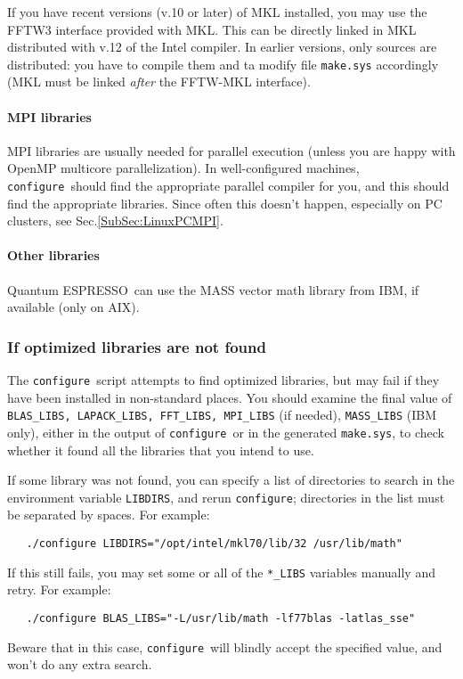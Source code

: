 \documentclass[12pt,a4paper]{article}
\def\qe{{\sc Quantum ESPRESSO}}
\def\configure{\texttt{configure}}
\begin{document}
If you have recent versions (v.10 or later) of MKL installed, you 
may use the FFTW3 interface provided with MKL. This can be directly
linked in MKL distributed with v.12 of the Intel compiler. In earlier 
versions, only sources are distributed: you have to compile them and 
ta modify file \texttt{make.sys} accordingly 
(MKL must be linked {\em after} the FFTW-MKL interface).

\paragraph{MPI libraries} 
MPI libraries are usually needed for parallel execution 
(unless you are happy with OpenMP multicore parallelization).
In well-configured machines, \configure\ should find the appropriate
parallel compiler for you, and this should find the appropriate
libraries. Since often this doesn't 
happen, especially on PC clusters, see Sec.\ref{SubSec:LinuxPCMPI}.

\paragraph{Other libraries}
\qe\ can use the MASS vector math
library from IBM, if available (only on AIX).

\subsubsection{If optimized libraries are not found}
The \configure\ script attempts to find optimized libraries, but may fail
if they have been installed in non-standard places. You should examine
the final value of \texttt{BLAS\_LIBS, LAPACK\_LIBS, FFT\_LIBS, MPI\_LIBS} (if needed),
\texttt{MASS\_LIBS} (IBM only), either in the output of \configure\ or in the generated
\texttt{make.sys}, to check whether it found all the libraries that you intend to use.
    
If some library was not found, you can specify a list of directories to search
in the environment variable \texttt{LIBDIRS}, 
and rerun \configure; directories in the
list must be separated by spaces. For example:
\begin{verbatim}
   ./configure LIBDIRS="/opt/intel/mkl70/lib/32 /usr/lib/math"
\end{verbatim}
If this still fails, you may set some or all of the \texttt{*\_LIBS} variables manually
and retry. For example:
\begin{verbatim}
   ./configure BLAS_LIBS="-L/usr/lib/math -lf77blas -latlas_sse"
\end{verbatim}
Beware that in this case, \configure\ will blindly accept the specified value,
and won't do any extra search. 
    
\end{document}
